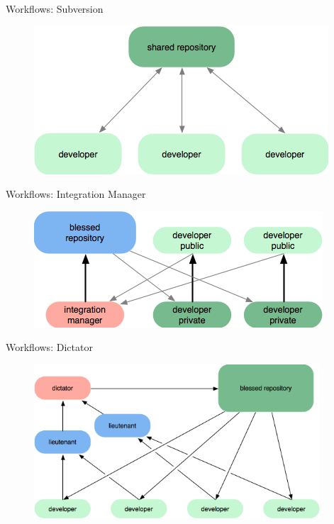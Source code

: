 \documentclass{beamer}
\begin{document}
\begin{frame}{Workflows: Subversion}

  \begin{figure}
     \includegraphics[scale=1.0]{./images/workflow-svn.png}
  \end{figure}

\end{frame}

\begin{frame}{Workflows: Integration Manager}
 
  \begin{figure}
     \includegraphics[scale=1.0]{./images/workflow-integration-manager.png}
  \end{figure}

\end{frame}

\begin{frame}{Workflows: Dictator}
 
  \begin{figure}
     \includegraphics[width=0.95\textwidth]{./images/workflow-dictator.png}
  \end{figure}

\end{frame}
\end{document}
